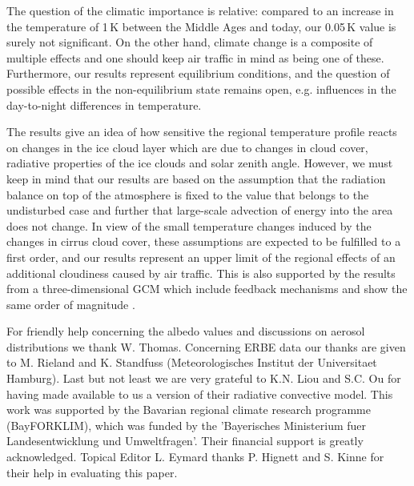 \documentclass[agp]{svjour}
\begin{document}
The question of the climatic importance is relative: compared to an
increase in the temperature of 1\,K between the Middle Ages and today,
our 0.05\,K value is surely not significant. On the other hand, climate
change is a composite of multiple effects and one should keep air
traffic in mind as being one of these. Furthermore, our results
represent equilibrium conditions, and the question of possible effects
in the non-equilibrium state remains open, e.g. influences in the
day-to-night differences in temperature.

The results give an idea of how sensitive the regional temperature
profile reacts on changes in the ice cloud layer which are due to
changes in cloud cover, radiative properties of the ice clouds and solar
zenith angle. However, we must keep in mind that our results are based
on the assumption that the radiation balance on top of the atmosphere is
fixed to the value that belongs to the undisturbed case and further that
large-scale advection of energy into the area does not change. In view
of the small temperature changes induced by the changes in cirrus cloud
cover, these assumptions are expected to be fulfilled to a first order,
and our results represent an upper limit of the regional effects of an
additional cloudiness caused by air traffic. This is also supported by
the results from a three-dimensional GCM which include feedback
mechanisms and show the same order of magnitude \citep{Po96}.

\begin{acknowledgement}
For friendly help concerning the albedo values and discussions on
aerosol distributions we thank W. Thomas. Concerning ERBE data our
thanks are given to M. Rieland and K. Standfuss (Meteorologisches
Institut der Universitaet Hamburg). Last but not least we are very
grateful to K.N. Liou and S.C. Ou for having made available to us a
version of their radiative convective model. This work was supported by
the Bavarian regional climate research programme (BayFORKLIM), which was
funded by the 'Bayerisches Ministerium fuer Landesentwicklung und
Umweltfragen'. Their financial support is greatly acknowledged. Topical
Editor L. Eymard thanks P. Hignett and S. Kinne for their help in
evaluating this paper.
\end{acknowledgement}

\vspace{-5pt}                      %
\end{document}
